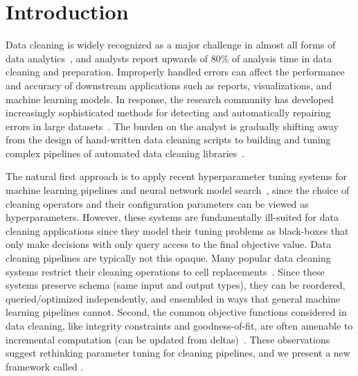 \section{Introduction}\label{intro}\sloppy
Data cleaning is widely recognized as a major challenge in almost all forms of data analytics~\cite{nytimes}, and analysts report upwards of 80\% of analysis time in data cleaning and preparation.
Improperly handled errors can affect the performance and accuracy of downstream applications such as reports, visualizations, and machine learning models.
In response, the research community has developed increasingly sophisticated methods for detecting and automatically repairing errors in large datasets~\cite{dc, rekatsinas2017holoclean, DBLP:journals/pvldb/KrishnanWWFG16, DBLP:conf/sigmod/ChuIKW16, mudgal2018deep, doan2018toward}.
The burden on the analyst is gradually shifting away from the design of hand-written data cleaning scripts to building and tuning complex pipelines of automated data cleaning libraries~\cite{krishnan2016hilda}.

The natural first approach is to apply recent hyperparameter tuning systems for machine learning pipelines and neural network model search~\cite{li2017hyperband, sparks2017keystoneml, baylor2017tfx, golovin2017google, liaw2018tune}, since the choice of cleaning operators and their configuration parameters can be viewed as hyperparameters.
However, these systems are fundamentally ill-suited for data cleaning applications since they model their tuning problems as black-boxes that only make decisions with only query access to the final objective value.
Data cleaning pipelines are typically not this opaque.
Many popular data cleaning systems restrict their cleaning operations to cell replacements~\cite{rekatsinas2017holoclean,DBLP:conf/sigmod/ChuIKW16, DBLP:journals/pvldb/KrishnanWWFG16}.
Since these systems preserve schema (same input and output types), they can be reordered, queried/optimized independently, and ensembled in ways that general machine learning pipelines cannot.
Second, the common objective functions considered in data cleaning, like integrity constraints and goodness-of-fit, are often amenable to incremental computation (can be updated from deltas)~\cite{fan2014incremental}.
These observations suggest rethinking parameter tuning for cleaning pipelines, and we present a new framework called \sys.

